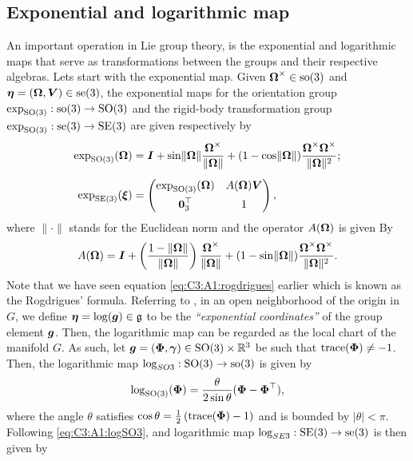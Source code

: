 \subsection{Exponential and logarithmic map}
An important operation in Lie group theory, is the exponential and logarithmic maps that serve as transformations between the groups and their respective algebras. Lets start with the exponential map. Given $\boldsymbol{\Omega}^\times\in \textup{\textrm{so}}(3)$ and ${\boldsymbol{\eta}} = (\boldsymbol{\Omega},{\boldsymbol{V}}) \in \textup{\textrm{se}}(3)$, the exponential maps for the orientation group $\exp_{\textup{\textrm{SO}}(3)}: \textup{\textrm{so}}(3) \to \textup{\textrm{SO}}(3)$ and the rigid-body transformation group $\exp_{\textup{\textrm{SO}}(3)}: \textup{\textrm{se}}(3) \to \textup{\textrm{SE}}(3)$ are given respectively by
%
\begin{align}
\exp_{\SO{3}}(\OmegaB) & = \IB + \sin \lVert \OmegaB \rVert\frac{\OmegaB^\times}{\lVert \OmegaB \rVert} + (1 - \cos \lVert \OmegaB \rVert) \frac{ \OmegaB^\times \OmegaB^\times }{\lVert \OmegaB \rVert^2}; \label{eq:C3:A1:rogdrigues} \\[0.45em] \vspace{5mm}
\exp_{\SE{3}}(\xiB) & =
\begin{pmatrix}
\exp_{\SO{3}}(\OmegaB) & A(\OmegaB) \VB \\[0.45em]\vec{0}_3^\top & 1
\end{pmatrix},
\end{align}
%
where $\lVert \cdot \rVert$ stands for the Euclidean norm and the operator $A(\boldsymbol{\Omega})$ is given By
%
\begin{equation}
A(\boldsymbol{\Omega}) = {\boldsymbol{I}} + \left(\frac{1 - \lVert \boldsymbol{\Omega} \rVert}{\lVert \boldsymbol{\Omega} \rVert}\right) \frac{\boldsymbol{\Omega}^\times}{\lVert \boldsymbol{\Omega} \rVert} + (1 - \sin \lVert \boldsymbol{\Omega} \rVert) \frac{ \boldsymbol{\Omega}^\times \boldsymbol{\Omega}^\times }{\lVert \boldsymbol{\Omega} \rVert^2}.
\end{equation}
%
Note that we have seen equation \eqref{eq:C3:A1:rogdrigues} earlier which is known as the Rogdrigues' formula. Referring to \cite{Bullo1995}, in an open neighborhood of the origin in $G$, we define ${\boldsymbol{\eta}} = \log({\boldsymbol{g}}) \in \mathfrak{g}$ to be the \emph{``exponential coordinates''} of the group element ${\boldsymbol{g}}$. 
Then, the logarithmic map can be regarded as the local chart of the manifold $G$. 
As such, let ${\boldsymbol{g}} = ({\boldsymbol{\Phi}}, {\boldsymbol{\gamma}}) \in \textup{\textrm{SO}}(3) \times \mathbb{R}^3$ be such that $\text{trace}({\boldsymbol{\Phi}}) \neq -1$. Then, the logarithmic map $\log_{SO{3}}: \textup{\textrm{SO}}(3) \to \textup{\textrm{so}}(3)$ is given by
%
\begin{equation}
  \log_{\textup{\textrm{SO}}(3)}({\boldsymbol{\Phi}}) = \frac{\theta}{2\sin\theta}({\boldsymbol{\Phi}} - {\boldsymbol{\Phi}}^\top), 
  \label{eq:C3:A1:logSO3} 
\end{equation}
%
where the angle $\theta$ satisfies $\cos \theta = \frac{1}{2} \left(\text{trace}({\boldsymbol{\Phi}})- 1 \right)$ and is bounded by $|\theta| < \pi$. Following \eqref{eq:C3:A1:logSO3}, and logarithmic map $\log_{SE{3}}: \textup{\textrm{SE}}(3) \to \textup{\textrm{se}}(3)$ is then given by
